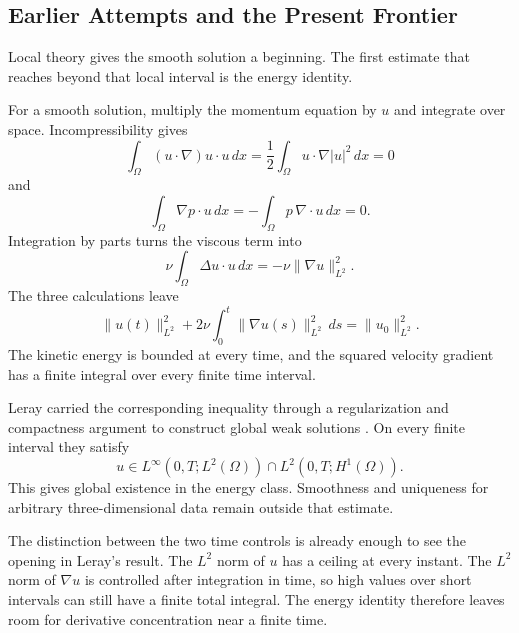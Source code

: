 \subsection{Earlier Attempts and the Present Frontier}\label{sub:HistoricalEstimates}

Local theory gives the smooth solution a beginning.
The first estimate that reaches beyond that local interval is the energy identity.


For a smooth solution, multiply the momentum equation by \(u\) and integrate over space.
Incompressibility gives
\[
  \int_\Omega (u\cdot\nabla)u\cdot u\,dx
  =
  \frac12\int_\Omega u\cdot\nabla |u|^2\,dx
  =
  0
\]
and
\[
  \int_\Omega \nabla p\cdot u\,dx
  =
  -\int_\Omega p\,\nabla\cdot u\,dx
  =
  0.
\]
Integration by parts turns the viscous term into
\[
  \nu\int_\Omega \Delta u\cdot u\,dx
  =
  -\nu\lVert\nabla u\rVert_{L^2}^{2}.
\]
The three calculations leave
\[
  \lVert u(t)\rVert_{L^2}^{2}
  +
  2\nu\int_0^t\lVert\nabla u(s)\rVert_{L^2}^{2}\,ds
  =
  \lVert u_0\rVert_{L^2}^{2}.
\]
The kinetic energy is bounded at every time, and the squared velocity gradient has a finite integral over every finite time interval.

Leray carried the corresponding inequality through a regularization and compactness argument to construct global weak solutions \parencite{Leray1934}.
On every finite interval they satisfy
\[
  u\in
  L^\infty(0,T;L^2(\Omega))
  \cap
  L^2(0,T;H^1(\Omega)).
\]
This gives global existence in the energy class.
Smoothness and uniqueness for arbitrary three-dimensional data remain outside that estimate.

The distinction between the two time controls is already enough to see the opening in Leray's result.
The \(L^2\) norm of \(u\) has a ceiling at every instant.
The \(L^2\) norm of \(\nabla u\) is controlled after integration in time, so high values over short intervals can still have a finite total integral.
The energy identity therefore leaves room for derivative concentration near a finite time.

